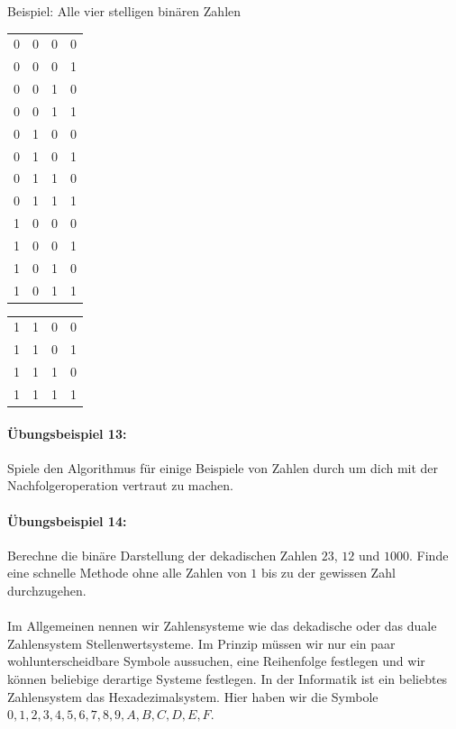\documentclass[11pt,a4paper,leqno]{report}
\numberwithin{equation}{chapter}
\begin{document}
Beispiel: Alle vier stelligen bin\"aren Zahlen
\begin{center}
	\begin{tabular}{c c c c}
		0 & 0 & 0 & 0\\
		0 & 0 & 0 & 1\\
		0 & 0 & 1 & 0\\
		0 & 0 & 1 & 1\\
		0 & 1 & 0 & 0\\
		0 & 1 & 0 & 1\\
		0 & 1 & 1 & 0\\
		0 & 1 & 1 & 1\\
		1 & 0 & 0 & 0\\
		1 & 0 & 0 & 1\\
		1 & 0 & 1 & 0\\
		1 & 0 & 1 & 1\\
	\end{tabular} 

	\begin{tabular}{c c c c}
		1 & 1 & 0 & 0\\
		1 & 1 & 0 & 1\\
		1 & 1 & 1 & 0\\
		1 & 1 & 1 & 1\\
	\end{tabular}  
\end{center}
\paragraph{\"Ubungsbeispiel 13:} Spiele den Algorithmus f\"ur einige Beispiele von Zahlen durch um dich mit der Nachfolgeroperation vertraut zu machen.
\paragraph{\"Ubungsbeispiel 14:} Berechne die bin\"are Darstellung der dekadischen Zahlen $23$, $12$ und $1000$. Finde eine schnelle Methode ohne alle Zahlen von $1$ bis zu der gewissen Zahl durchzugehen.\\
\\
Im Allgemeinen nennen wir Zahlensysteme wie das dekadische oder das duale Zahlensystem Stellenwertsysteme. Im Prinzip m\"ussen wir nur ein paar wohlunterscheidbare Symbole aussuchen, eine Reihenfolge festlegen und wir k\"onnen beliebige derartige Systeme festlegen. In der Informatik ist ein beliebtes Zahlensystem das Hexadezimalsystem. Hier haben wir die Symbole $0, 1, 2, 3, 4, 5, 6, 7, 8, 9, A, B, C, D, E, F$.
\end{document}

